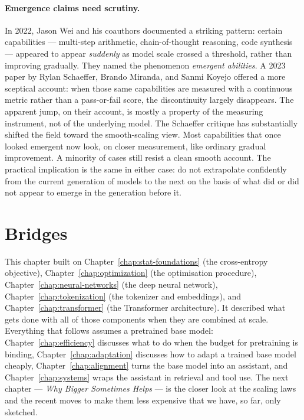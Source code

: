 \paragraph{Emergence claims need scrutiny.} In 2022, Jason Wei
and his coauthors documented a striking pattern: certain
capabilities --- multi-step arithmetic, chain-of-thought
reasoning, code synthesis --- appeared to appear \emph{suddenly}
as model scale crossed a threshold, rather than improving
gradually. They named the phenomenon \emph{emergent abilities}.
A 2023 paper by Rylan Schaeffer, Brando Miranda, and Sanmi
Koyejo offered a more sceptical account: when those same
capabilities are measured with a continuous metric rather than
a pass-or-fail score, the discontinuity largely disappears.
The apparent jump, on their account, is mostly a property of
the measuring instrument, not of the underlying model. The
Schaeffer critique has substantially shifted the field toward
the smooth-scaling view. Most capabilities that once looked
emergent now look, on closer measurement, like ordinary
gradual improvement. A minority of cases still resist a clean
smooth account. The practical implication is the same in
either case: do not extrapolate confidently from the current
generation of models to the next on the basis of what did or
did not appear to emerge in the generation before it.

\section*{Bridges}

This chapter built on Chapter~\ref{chap:stat-foundations} (the cross-entropy objective),
Chapter~\ref{chap:optimization} (the optimisation procedure), Chapter~\ref{chap:neural-networks} (the deep
neural network), Chapter~\ref{chap:tokenization} (the tokenizer and embeddings), and
Chapter~\ref{chap:transformer} (the Transformer architecture). It described what
gets done with all of those components when they are combined
at scale. Everything that follows assumes a pretrained base
model: Chapter~\ref{chap:efficiency} discusses what to do when the budget for
pretraining is binding, Chapter~\ref{chap:adaptation} discusses how to adapt a
trained base model cheaply, Chapter~\ref{chap:alignment} turns the base model into
an assistant, and Chapter~\ref{chap:systems} wraps the assistant in retrieval
and tool use. The next chapter --- \emph{Why Bigger Sometimes
Helps} --- is the closer look at the scaling laws and the
recent moves to make them less expensive that we have, so far,
only sketched.
